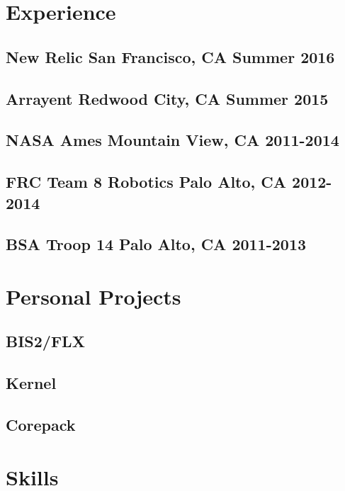 \documentclass[letterpaper]{article}
\newcommand{\subtitle}{\normalfont\sffamily\color{black}\footnotesize}
\begin{document}
\sffamily
\section*{Experience}
\subsection*{New Relic \subtitle San Francisco, CA Summer 2016}

\subsection*{Arrayent \subtitle Redwood City, CA Summer 2015}

\subsection*{NASA Ames \subtitle Mountain View, CA 2011-2014}

\subsection*{FRC Team 8 Robotics \subtitle Palo Alto, CA 2012-2014}

\subsection*{BSA Troop 14 \subtitle Palo Alto, CA 2011-2013}

\section*{Personal Projects}

\subsection*{BIS2/FLX}

\subsection*{Kernel}

\subsection*{Corepack}

\section*{Skills}
\end{document}
